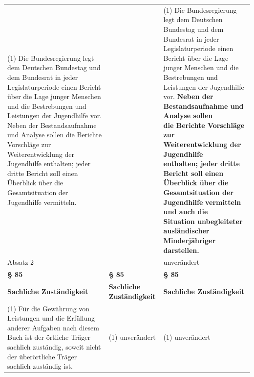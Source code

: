 \documentclass[10pt,a4paper,landscape]{article}
\begin{document}
\begin{longtable}{|L{8.2cm}|L{8.2cm}|L{8.2cm}|}
(1) Die Bundesregierung legt dem  \newline Deutschen Bundestag und dem Bundesrat  \newline in jeder Legislaturperiode einen Bericht  \newline über die Lage junger Menschen und die  \newline Bestrebungen und Leistungen der  \newline Jugendhilfe vor. Neben der  \newline Bestandsaufnahme und Analyse sollen die  \newline Berichte Vorschläge zur Weiterentwicklung  \newline der Jugendhilfe enthalten; jeder dritte  \newline Bericht soll einen Überblick über die  \newline Gesamtsituation der Jugendhilfe \textcolor{diffred}{vermitteln.} &  & (1) Die Bundesregierung legt dem  \newline Deutschen Bundestag und dem Bundesrat  \newline in jeder Legislaturperiode einen Bericht  \newline über die Lage junger Menschen und die  \newline Bestrebungen und Leistungen der  \newline Jugendhilfe vor. \textbf{Neben der  \newline Bestandsaufnahme und Analyse sollen  \newline die Berichte Vorschläge zur  \newline Weiterentwicklung der Jugendhilfe  \newline enthalten; jeder dritte Bericht soll einen  \newline Überblick über die Gesamtsituation der  \newline Jugendhilfe }\textbf{\textcolor{diffgreen}{vermitteln und auch die  \newline Situation unbegleiteter ausländischer  \newline Minderjähriger darstellen.}} \\
\hhline{|---|}
Absatz 2 &  & unverändert \\
\hhline{|---|}
\textbf{\S{} 85} & \textbf{\S{} 85} & \textbf{\S{} 85} \\
\hhline{|---|}
\textbf{Sachliche Zuständigkeit} & \textbf{Sachliche Zuständigkeit} & \textbf{Sachliche Zuständigkeit} \\
\hhline{|---|}
(1) Für die Gewährung von Leistungen und  \newline die Erfüllung anderer Aufgaben nach  \newline diesem Buch ist der örtliche Träger  \newline sachlich zuständig, soweit nicht der  \newline überörtliche Träger sachlich zuständig ist. & (1) unverändert & (1) unverändert \\

\end{longtable}
\end{document}
